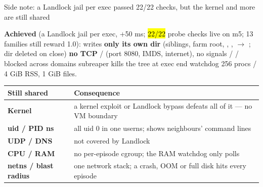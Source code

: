 \begin{frame}{Side note: a Landlock jail per exec passed 22/22 checks, but the kernel and more are still shared}
\colorbox{panel}{\parbox{\dimexpr\linewidth-2\fboxsep}{\scriptsize\textbf{\color{awsteal}Achieved} (a Landlock jail per exec, +50 ms; \hl{22/22} probe checks live on m5; 13 families still reward 1.0): writes \textbf{only its own dir} (siblings, farm root, , ,  $\rightarrow$ ; dir deleted on close) \textperiodcentered{} \textbf{no TCP} / (port 8080, IMDS, internet), no  \textperiodcentered{} signals /  /  blocked across domains \textperiodcentered{} subreaper kills the tree at exec end \textperiodcentered{} watchdog 256 procs / 4 GiB RSS, 1 GiB files.}}
\vspace{3mm}
\footnotesize
\begin{tabularx}{\textwidth}{@{}l Y@{}}
\toprule
\textbf{Still shared} & \textbf{Consequence}\\
\midrule
\textbf{Kernel} & a kernel exploit or Landlock bypass defeats all of it --- no VM boundary\\
\textbf{uid / PID ns} & all uid 0 in one userns;  shows neighbours' command lines\\
\textbf{UDP / DNS} & not covered by Landlock\\
\textbf{CPU / RAM} & no per-episode cgroup; the RAM watchdog only polls\\
\textbf{netns / blast radius} & one network stack; a crash, OOM or full disk hits every episode\\
\bottomrule
\end{tabularx}
\end{frame}


